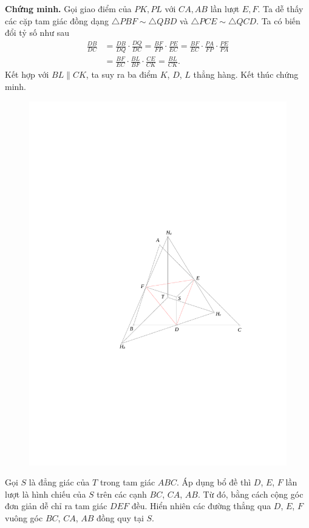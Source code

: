\begin{multicols}{2}
\begin{figure}[H]
		\vspace*{-10pt}
	\end{figure}
	{\bf\color{cackithi} Chứng minh.} Gọi giao điểm của $PK,PL$ với $CA,AB$ lần lượt $E,F$. Ta dễ thấy các cặp tam giác đồng dạng $\triangle PBF\sim\triangle QBD$ và $\triangle PCE\sim\triangle QCD$. Ta có biến đổi tỷ số như sau
	\begin{align*}
		\frac{DB}{DC}&=\frac{DB}{DQ}\!\cdot\!\frac{DQ}{DC}\!=\!\frac{BF}{FP}\!\cdot\!\frac{PE}{EC}\!=\!\frac{BF}{EC}\!\cdot\!\frac{PA}{FP}\!\cdot\!\frac{PE}{PA}\\
		&=\frac{BF}{EC}\cdot\frac{BL}{BF}\cdot\frac{CE}{CK}=\frac{BL}{CK}.
	\end{align*} 
	Kết hợp với $BL\parallel CK$, ta suy ra ba điểm $K$, $D$, $L$ thẳng hàng. Kết thúc chứng minh.
	\begin{figure}[H]
		\centering
		\captionsetup{labelformat= empty, justification=centering}
		\includegraphics[width= 0.8\linewidth]{figure7799}
		\vspace*{-10pt}
	\end{figure}
	Gọi $S$ là đẳng giác của $T$ trong tam giác $ABC$. Áp dụng bổ đề thì $D$, $E$, $F$ lần lượt là hình chiếu của $S$ trên các cạnh $BC$, $CA$, $AB$. Từ đó, bằng cách cộng góc đơn giản dễ chỉ ra tam giác $DEF$ đều. Hiển nhiên các đường thẳng qua $D$, $E$, $F$ vuông góc $BC$, $CA$, $AB$ đồng quy tại $S$.

\end{multicols}

